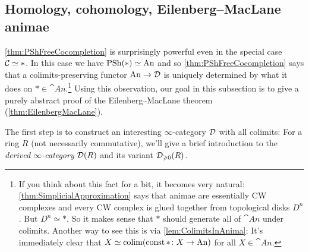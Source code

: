 \subsection{Homology, cohomology, Eilenberg--MacLane animae}\label{subsec:EilenbergMacLane}
\cref{thm:PShFreeCocompletion} is surprisingly powerful even in the special case $\mathcal{C}\simeq *$. In this case we have $\operatorname{PSh}(*)\simeq \mathrm{An}$ and so  \cref{thm:PShFreeCocompletion} says that a colimits-preserving functor $\mathrm{An}\rightarrow\mathcal{D}$ is uniquely determined by what it does on $*\in\cat{An}$.\footnote{If you think about this fact for a bit, it becomes very natural: \cref{thm:SimplicialApproximation} says that animae are essentially CW complexes and every CW complex is glued together from topological disks $D^n$. But $D^n\simeq *$. So it makes sense that $*$ should generate all of $\cat{An}$ under colimits. Another way to see this is via \cref{lem:ColimitsInAnima}: It's immediately clear that $X\simeq \operatorname*{colim}(\operatorname{const}*\colon X\rightarrow\mathrm{An})$ for all $X\in\cat{An}$.} Using this observation, our goal in this subsection is to give a purely abstract proof of the Eilenberg--MacLane theorem (\cref{thm:EilenbergMacLane}).

The first step is to construct an interesting $\infty$-category $\mathcal{D}$ with all colimits: For a ring $R$ (not necessarily commutative), we'll give a brief introduction to the \emph{derived $\infty$-category} $\mathcal{D}(R)$ and its variant $\mathcal{D}_{\geqslant 0}(R)$.

